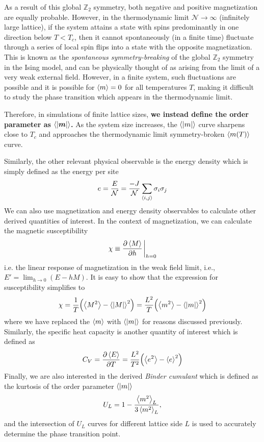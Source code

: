 \documentclass[../thesis_main.tex]{subfiles}
\begin{document}
As a result of this global $\mathbb{Z}_2$ symmetry, both negative and positive magnetization are equally probable. However, in the thermodynamic limit $\mathcal{N} \to \infty$ (infinitely large lattice), if the system attains a state with spins predominantly in one direction below $T < T_c$, then it cannot spontaneously (in a finite time) fluctuate through a series of local spin flips into a state with the opposite magnetization. This is known as the \textit{spontaneous symmetry-breaking} of the global $\mathbb{Z}_2$ symmetry in the Ising model, and can be physically thought of as arising from the limit of a very weak external field. However, in a finite system, such fluctuations are possible and it is possible for $\expval{m} = 0$ for all temperatures $T$, making it difficult to study the phase transition which appears in the thermodynamic limit.

Therefore, in simulations of finite lattice sizes, \textbf{we instead define the order parameter as} ${\expval{|\boldsymbol{m}|}}$\textbf{.} As the system size increases, the $\expval{|m|}$ curve sharpens close to $T_c$ and approaches the thermodynamic limit symmetry-broken $\expval{m(T)}$ curve.

Similarly, the other relevant physical observable is the energy density which is simply defined as the energy per site
\begin{equation}
    e = \frac{E}{\mathcal{N}} = \frac{-J}{\mathcal{N}} \sum_{\expval{i,j}} \sigma_i \sigma_j
\end{equation}  
We can also use magnetization and energy density observables to calculate other derived quantities of interest. In the context of magnetization, we can calculate the magnetic susceptibility 
\begin{equation}
    \chi \equiv \pdv{\expval{M}}{h}\eval_{h=0}
\end{equation}
i.e. the linear response of magnetization in the weak field limit, i.e.,  $\displaystyle E' = \lim_{h \to 0} (E - hM)$. It is easy to show that the expression for susceptibility simplifies to
\begin{equation}
    \chi = \frac{1}{T}\qty(\expval{M^2} - \expval{|M|}^2) = \frac{L^2}{T}\qty(\expval{m^2} - \expval{|m|}^2)
\end{equation}
where we have replaced the $\expval{m}$ with $\expval{|m|}$ for reasons discussed previously. Similarly, the specific heat capacity is another quantity of interest which is defined as 
\begin{equation}
    C_V = \pdv{\expval{E}}{T} = \frac{L^2}{T^2} \qty(\expval{e^2} - \expval{e}^2)
\end{equation}
Finally, we are also interested in the derived \textit{Binder cumulant} which is defined as the kurtosis of the order parameter $\expval{|m|}$
\begin{equation}
    U_L = 1 - \frac{\expval{m^2}_L}{3\expval{m^2}_L},
\end{equation} 
and the intersection of $U_L$ curves for different lattice side $L$ is used to accurately determine the phase transition point.
\end{document}
